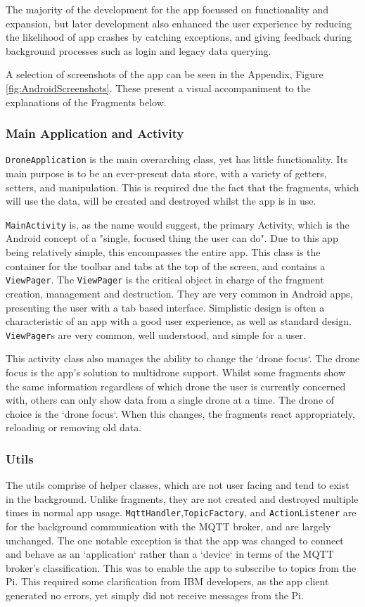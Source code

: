 \documentclass{article}
\begin{document}
The majority of the development for the app focussed on functionality and expansion, but later development also enhanced the user experience by reducing the likelihood of app crashes by catching exceptions, and giving feedback during background processes such as login and legacy data querying. 

A selection of screenshots of the app can be seen in the Appendix, Figure \ref{fig:AndroidScreenshots}. These present a visual accompaniment to the explanations of the Fragments below. 

\subsubsection{Main Application and Activity}
\texttt{DroneApplication} is the main overarching class, yet has little functionality. Its main purpose is to be an ever-present data store, with a variety of getters, setters, and manipulation. This is required due the fact that the fragments, which will use the data, will be created and destroyed whilst the app is in use. 

\texttt{MainActivity} is, as the name would suggest, the primary Activity, which is the Android concept of a "single, focused thing the user can do"\cite{androidActivity}. Due to this app being relatively simple, this encompasses the entire app. This class is the container for the toolbar and tabs at the top of the screen, and contains a \texttt{ViewPager}. The \texttt{ViewPager} is the critical object in charge of the fragment creation, management and destruction. They are very common in Android apps, presenting the user with a tab based interface. Simplistic design is often a characteristic of an app with a good user experience, as well as standard design. \texttt{ViewPager}s are very common, well understood, and simple for a user. 

This activity class also manages the ability to change the `drone focus`. The drone focus is the app's solution to multidrone support. Whilst some fragments show the same information regardless of which drone the user is currently concerned with, others can only show data from a single drone at a time. The drone of choice is the `drone focus`. When this changes, the fragments react appropriately, reloading or removing old data. 

\subsubsection{Utils}
The utils comprise of helper classes, which are not user facing and tend to exist in the background. Unlike fragments, they are not created and destroyed multiple times in normal app usage. \texttt{MqttHandler},\texttt{TopicFactory}, and \texttt{ActionListener} are for the background communication with the MQTT broker, and are largely unchanged. The one notable exception is that the app was changed to connect and behave as an `application` rather than a `device` in terms of the MQTT broker's classification. This was to enable the app to subscribe to topics from the Pi. This required some clarification from IBM developers, as the app client generated no errors, yet simply did not receive messages from the Pi\cite{githubTopicIssue}.
\end{document}
